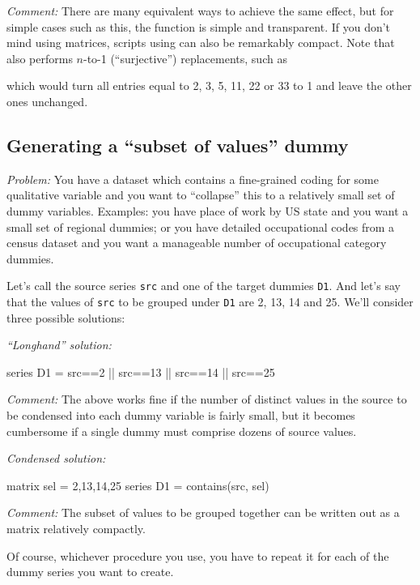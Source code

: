 \emph{Comment:} There are many equivalent ways to achieve the same
effect, but for simple cases such as this, the  function
is simple and transparent. If you don't mind using matrices, scripts
using  can also be remarkably compact. Note that
 also performs $n$-to-1 (``surjective'') replacements,
such as
\begin{code}
series x = replace{z, {2, 3, 5, 11, 22, 33}, 1)
\end{code}
which would turn all entries equal to 2, 3, 5, 11, 22 or 33 to 1 and
leave the other ones unchanged.

\subsection{Generating a ``subset of values'' dummy}

\emph{Problem:} You have a dataset which contains a fine-grained
coding for some qualitative variable and you want to ``collapse'' this
to a relatively small set of dummy variables. Examples: you have place
of work by US state and you want a small set of regional dummies; or
you have detailed occupational codes from a census dataset and you
want a manageable number of occupational category dummies.

Let's call the source series \texttt{src} and one of the target dummies
\texttt{D1}. And let's say that the values of \texttt{src} to be grouped
under \texttt{D1} are 2, 13, 14 and 25. We'll consider three possible
solutions:

\emph{``Longhand'' solution:}
\begin{code}
series D1 = src==2 || src==13 || src==14 || src==25
\end{code}

\emph{Comment:} The above works fine if the number of distinct values
in the source to be condensed into each dummy variable is fairly
small, but it becomes cumbersome if a single dummy must comprise
dozens of source values.

\emph{Condensed solution:}
\begin{code}
matrix sel = {2,13,14,25}
series D1 = contains(src, sel)
\end{code}

\emph{Comment:} The subset of values to be grouped together can be
written out as a matrix relatively compactly.

Of course, whichever procedure you use, you have to repeat it for each of
the dummy series you want to create.

